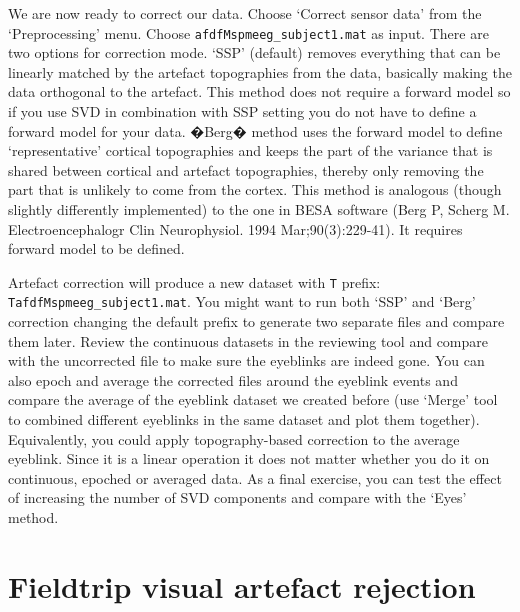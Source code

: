 We are now ready to correct our data. Choose `Correct sensor data' from the `Preprocessing' menu. Choose \texttt{afdfMspmeeg\_subject1.mat} as input. There are two options for correction mode. `SSP' (default) removes everything that can be linearly matched by the artefact topographies from the data, basically making the data orthogonal to the artefact. This method does not require a forward model so if you use SVD in combination with SSP setting you do not have to define a forward model for your data. �Berg� method uses the forward model to define `representative' cortical topographies and keeps the part of the variance that is shared between cortical and artefact topographies, thereby only removing the part that is unlikely to come from the cortex. This method is analogous (though slightly differently implemented) to the one in BESA software (Berg P, Scherg M. Electroencephalogr Clin Neurophysiol. 1994 Mar;90(3):229-41). It requires forward model to be defined.

Artefact correction will produce a new dataset with \texttt{T} prefix: \texttt{TafdfMspmeeg\_subject1.mat}. You might want to run both `SSP' and `Berg' correction changing the default prefix to generate two separate files and compare them later. Review the continuous datasets in the reviewing tool and compare with the uncorrected file to make sure the eyeblinks are indeed gone. You can also epoch and average the corrected files around the eyeblink events and compare the average of the eyeblink dataset we created before (use `Merge' tool to combined different eyeblinks in the same dataset and plot them together). Equivalently, you could apply topography-based correction to the average eyeblink. Since it is a linear operation it does not matter whether you do it on continuous, epoched or averaged data. As a final exercise, you can test the effect of increasing the number of SVD components and compare with the `Eyes' method. 


\section{Fieldtrip visual artefact rejection}

